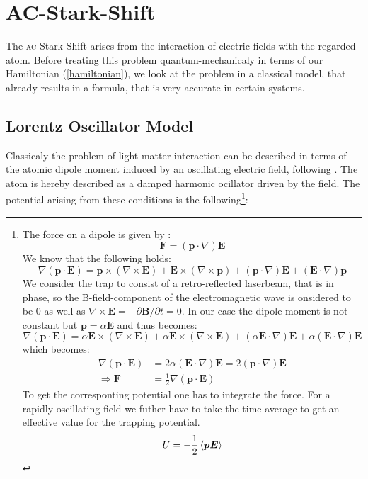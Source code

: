 \newpage
\newpage
\section{AC-Stark-Shift}
The \textsc{ac}-Stark-Shift arises from the interaction of electric fields with the regarded atom. Before treating this problem quantum-mechanicaly in terms of our Hamiltonian (\ref{hamiltonian}), we look at the problem in a classical model, that already results in a formula, that is very accurate in certain systems. 
\subsection{Lorentz Oscillator Model}

 Classicaly the problem of light-matter-interaction can be described in terms of the atomic dipole moment induced by an oscillating electric field, following \cite{dipole}. The atom is hereby described as a damped harmonic ocillator driven by the field. The potential arising from these conditions is the following\footnote{The force on a dipole is given by \cite{factor}:
\begin{equation*}
\boldsymbol{F}=(\boldsymbol{p}\cdot\nabla)\boldsymbol{E}
\end{equation*}
We know that the following holds:
\begin{equation*}
\nabla(\boldsymbol{p}\cdot\boldsymbol{E})=\boldsymbol{p}\times(\nabla\times\boldsymbol{E})+\boldsymbol{E}\times(\nabla\times\boldsymbol{p})+(\boldsymbol{p}\cdot\nabla)\boldsymbol{E}+(\boldsymbol{E}\cdot\nabla)\boldsymbol{p}
\label{dipoleforce}\end{equation*}
We consider the trap to consist of a retro-reflected laserbeam, that is in phase, so the B-field-component of the electromagnetic wave is onsidered to be 0 as well as $\nabla\times\boldsymbol{E}=-\partial\boldsymbol{B}/\partial t=0$. In our case the dipole-moment is not constant but \(\boldsymbol{p}=\alpha \boldsymbol{E}\) and thus becomes:
\begin{equation*}
\nabla(\boldsymbol{p}\cdot\boldsymbol{E})=\alpha\boldsymbol{E}\times(\nabla\times\boldsymbol{E})+\alpha\boldsymbol{E}\times(\nabla\times\boldsymbol{E})+(\alpha\boldsymbol{E}\cdot\nabla)\boldsymbol{E}+\alpha(\boldsymbol{E}\cdot\nabla)\boldsymbol{E}
\end{equation*}
which becomes:
\begin{align*}
\nabla(\boldsymbol{p}\cdot\boldsymbol{E})&=2\alpha(\boldsymbol{E}\cdot\nabla)\boldsymbol{E}=2(\boldsymbol{p}\cdot\nabla)\boldsymbol{E}\\
\Rightarrow \boldsymbol{F}&=\frac{1}{2}\nabla(\boldsymbol{p}\cdot\boldsymbol{E})
\end{align*}
To get the corresponting potential one has to integrate the force. For a rapidly oscillating field we futher have to take the time average to get an effective value for the trapping potential.
\begin{equation*}
U=-\frac{1}{2}\left\langle \boldsymbol{p E}\right\rangle
\end{equation*}}:
